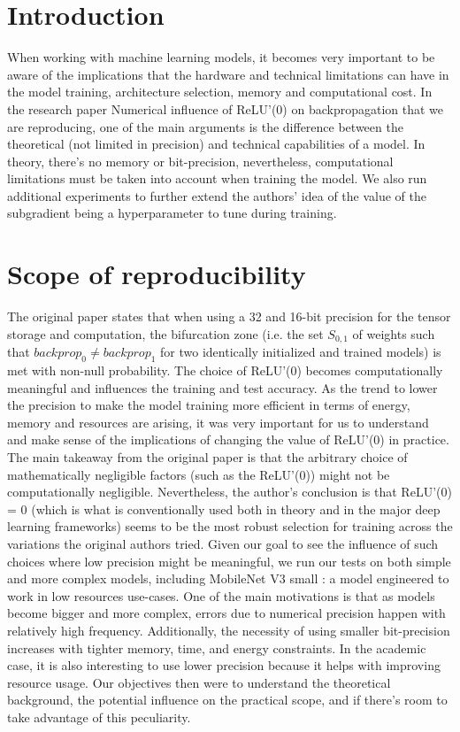 \section{Introduction}
When working with machine learning models, it becomes very important to be aware of the implications that the hardware and technical limitations can have in the model training, architecture selection, memory and computational cost. In the research paper Numerical influence of ReLU’(0) on backpropagation \cite{ORIGINAL} that we are reproducing, one of the main arguments is the difference between the theoretical (not limited in precision) and technical capabilities of a model. In theory, there's no memory or bit-precision, nevertheless, computational limitations must be taken into account when training the model. We also run additional experiments to further extend the authors' idea of the value of the subgradient being a hyperparameter to tune during training.

\section{Scope of reproducibility}
\label{sec:claims}

The original paper \cite{ORIGINAL} states that when using a 32 and 16-bit precision for the tensor storage and computation, the bifurcation zone (i.e. the set $S_{0,1}$ of weights such that $backprop_0 \neq backprop_1$ for two identically initialized and trained models) is met with non-null probability. The choice of ReLU'(0) becomes computationally meaningful and influences the training and test accuracy. As the trend to lower the precision to make the model training more efficient in terms of energy, memory and resources are arising, it was very important for us to understand and make sense of the implications of changing the value of ReLU'(0) in practice. The main takeaway from the original paper is that the arbitrary choice of mathematically negligible factors (such as the ReLU'(0)) might not be computationally negligible. Nevertheless, the author's conclusion is that ReLU'(0) = 0 (which is what is conventionally used both in theory and in the major deep learning frameworks) seems to be the most robust selection for training across the variations the original authors tried. Given our goal to see the influence of such choices where low precision might be meaningful, we run our tests on both simple and more complex models, including MobileNet V3 small \cite{MOBILENETV3}: a model engineered to work in low resources use-cases. One of the main motivations is that as models become bigger and more complex, errors due to numerical precision happen with relatively high frequency. Additionally, the necessity of using smaller bit-precision increases with tighter memory, time, and energy constraints. In the academic case, it is also interesting to use lower precision because it helps with improving resource usage. Our objectives then were to understand the theoretical background, the potential influence on the practical scope, and if there's room to take advantage of this peculiarity.

